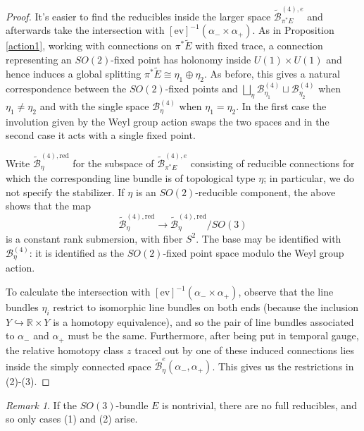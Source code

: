 \documentclass[10pt,a4paper]{amsart}
\newcommand{\pE}{\pi^* \! E}
\theoremstyle{definition}
\theoremstyle{remark}
\newtheorem{remark}[theorem]{Remark}
\numberwithin{figure}{qchap}
\begin{document}
\begin{proof}It's easier to find the reducibles inside the larger space $\widetilde{\mathcal B}^{(4),e}_{\pE}$ and afterwards take the intersection with $[\text{ev}]^{-1}(\alpha_- \times \alpha_+)$. As in Proposition \ref{action1}, working with connections on $\pi^*\tilde E$ with fixed trace, a connection representing an $SO(2)$-fixed point has holonomy inside $U(1) \times U(1)$ and hence induces a global splitting $\pi^* \tilde E \cong \eta_1 \oplus \eta_2$. As before, this gives a natural correspondence between the $SO(2)$-fixed points and $\bigsqcup_\eta \mathcal B^{(4)}_{\eta_1} \sqcup \mathcal B^{(4)}_{\eta_2}$ when $\eta_1 \neq \eta_2$ and with the single space $\mathcal B^{(4)}_\eta$ when $\eta_1 = \eta_2$. In the first case the involution given by the Weyl group action swaps the two spaces and in the second case it acts with a single fixed point. 

Write $\widetilde{\mathcal B}^{(4),\text{red}}_\eta$ for the subspace of $\widetilde{\mathcal B}^{(4),e}_{\pE}$ consisting of reducible connections for which the corresponding line bundle is of topological type $\eta$; in particular, we do not specify the stabilizer. If $\eta$ is an $SO(2)$-reducible component, the above shows that the map $$\widetilde{\mathcal B}^{(4),\text{red}}_\eta \to \widetilde{\mathcal B}^{(4),\text{red}}_\eta/SO(3)$$ is a constant rank submersion, with fiber $S^2$. The base may be identified with $\mathcal B^{(4)}_\eta$: it is identified as the $SO(2)$-fixed point space modulo the Weyl group action.

To calculate the intersection with $[\text{ev}]^{-1}(\alpha_- \times \alpha_+)$, observe that the line bundles $\eta_i$ restrict to isomorphic line bundles on both ends (because the inclusion $Y \hookrightarrow \mathbb R \times Y$ is a homotopy equivalence), and so the pair of line bundles associated to $\alpha_-$ and $\alpha_+$ must be the same. Furthermore, after being put in temporal gauge, the relative homotopy class $z$ traced out by one of these induced connections lies inside the simply connected space $\widetilde{\mathcal B}^{e}_{\eta}(\alpha_-, \alpha_+)$. This gives us the restrictions in (2)-(3).
\end{proof}

\begin{remark}If the $SO(3)$-bundle $E$ is nontrivial, there are no full reducibles, and so only cases (1) and (2) arise.
\end{remark}
\end{document}
